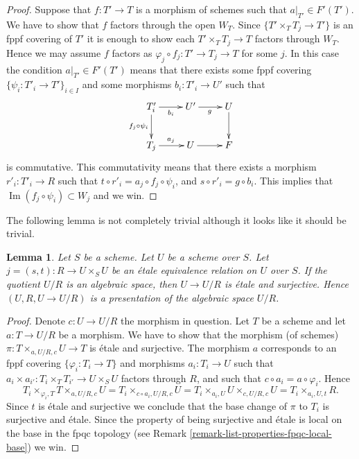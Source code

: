 \documentclass{stacks-project}
\theoremstyle{plain}
\newtheorem{lemma}[subsection]{Lemma}
\theoremstyle{definition}
\theoremstyle{remark}
\numberwithin{equation}{subsection}
\def\Im{\mathop{\mathrm{Im}}}
\begin{document}
\begin{proof}
\medskip\noindent
Suppose that $f : T' \to T$ is a morphism of schemes
such that $a|_{T'} \in F'(T')$. We have to show that
$f$ factors through the open $W_T$. Since
$\{T' \times_T T_j \to T'\}$ is an fppf covering of $T'$
it is enough to show each $T' \times_T T_j \to T$
factors through $W_T$. Hence we may assume $f$ factors
as $\varphi_j \circ f_j : T' \to T_j \to T$ for some $j$.
In this case the condition $a|_{T'} \in F'(T')$ means that there exists
some fppf covering $\{\psi_i : T'_i \to T'\}_{i \in I}$ and some
morphisms $b_i : T'_i \to U'$ such that
$$
\xymatrix{
T'_i \ar[r]_{b_i} \ar[d]_{f_j \circ \psi_i} & U' \ar[r]_g & U \ar[d] \\
T_j \ar[r]^{a_j} & U \ar[r] & F
}
$$
is commutative. This commutativity means that there exists a
morphism $r'_i : T'_i \to R$ such that
$t \circ r'_i = a_j \circ f_j \circ \psi_i$, and
$s \circ r'_i = g \circ b_i$. This implies that
$\Im(f_j \circ \psi_i) \subset W_j$ and we win.
\end{proof}

\noindent
The following lemma is not completely trivial although it looks
like it should be trivial.

\begin{lemma}
\label{lemma-when-it-works-it-works}
Let $S$ be a scheme. Let $U$ be a scheme over $S$.
Let $j = (s, t) : R \to U \times_S U$
be an \'etale equivalence relation on $U$ over $S$.
If the quotient $U/R$ is an algebraic space, then
$U \to U/R$ is \'etale and surjective. Hence
$(U, R, U \to U/R)$ is a presentation of the algebraic
space $U/R$.
\end{lemma}

\begin{proof}
Denote $c : U \to U/R$ the morphism in question.
Let $T$ be a scheme and let $a : T \to U/R$ be a morphism.
We have to show that the morphism (of schemes)
$\pi : T \times_{a, U/R, c} U \to T$ is \'etale and surjective.
The morphism $a$ corresponds to an fppf covering
$\{\varphi_i : T_i \to T\}$ and morphisms $a_i : T_i \to U$ such
that
$a_i \times a_{i'} : T_i \times_T T_{i'} \to U \times_S U$
factors through $R$, and such that $c \circ a_i = a \circ \varphi_i$.
Hence
$$
T_i \times_{\varphi_i, T} T \times_{a, U/R, c} U =
T_i \times_{c \circ a_i, U/R, c} U =
T_i \times_{a_i, U} U \times_{c, U/R, c} U = T_i \times_{a_i, U, t} R.
$$
Since $t$ is \'etale and surjective we conclude that
the base change of $\pi$ to $T_i$ is surjective and \'etale.
Since the property of being surjective and \'etale is local
on the base in the fpqc topology (see
Remark \ref{remark-list-properties-fpqc-local-base})
we win.
\end{proof}
\end{document}
